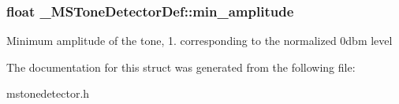 \subsubsection[{min\-\_\-amplitude}]{\setlength{\rightskip}{0pt plus 5cm}float \-\_\-\-M\-S\-Tone\-Detector\-Def\-::min\-\_\-amplitude}\label{struct__MSToneDetectorDef_adf697463ecf756228d4774f7610abff0}
Minimum amplitude of the tone, 1. corresponding to the normalized 0dbm level 

The documentation for this struct was generated from the following file\-:\begin{DoxyCompactItemize}
\item 
mstonedetector.\-h\end{DoxyCompactItemize}
